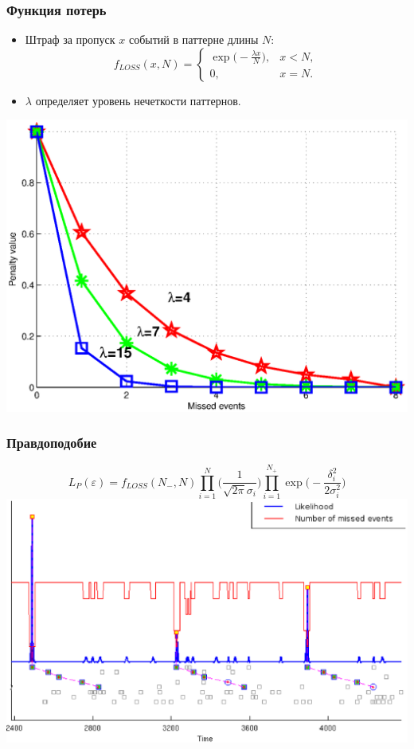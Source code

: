 \documentclass[smaller]{beamer}
\begin{document}
\begin{frame}
  \frametitle{Функция потерь}
  \begin{itemize}
  \item Штраф за пропуск $x$ событий в паттерне длины $N$:
  $$
  f_{LOSS}(x,N)= \begin{cases}
   \exp\bigl(-\frac{\lambda x}{N}\bigr), & x < N, \\
   0,                                    & x=N.
   \end{cases}
  $$
  \item $\lambda$ определяет уровень нечеткости паттернов.
   \end{itemize}
   \includegraphics[scale=0.35]{MB_LF.eps}
\end{frame}

\begin{frame}
  \frametitle{Правдоподобие}
   $$L_P(\varepsilon)=f_{LOSS}(N_-,N)\prod_{i=1}^{N}\biggl( \frac1{\sqrt{2\pi}\sigma_i }\biggr)  \prod_{i=1}^{N_+}\exp\biggl(- \frac{\delta_i^2}{2\sigma_i^2}\biggr) $$
   \includegraphics[scale=0.4]{norm_12_of_14.eps}
\end{frame}
\end{document}
